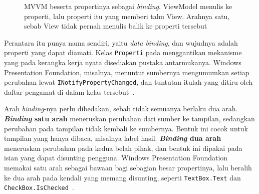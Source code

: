 \begin{figure}[htbp]
  \centering
  \caption{MVVM beserta propertinya sebagai \textit{binding}. ViewModel menulis ke
    properti, lalu properti itu yang memberi tahu View. Arahnya satu, sebab
    View tidak pernah menulis balik ke properti tersebut}
  \label{fig:mvvm}
\end{figure}

Perantara itu punya nama sendiri, yaitu \textit{data
binding}, dan wujudnya
adalah properti yang dapat diamati. Kelas \texttt{Properti} pada
 menggantikan mekanisme yang pada kerangka
kerja nyata disediakan pustaka antarmukanya. Windows Presentation Foundation,
misalnya, menuntut sumbernya mengumumkan setiap perubahan lewat
\texttt{INotifyPropertyChanged}, dan tuntutan itulah yang ditiru oleh daftar
pengamat di dalam kelas tersebut~\cite{microsoft2024binding}.

Arah \textit{binding}-nya perlu dibedakan, sebab tidak semuanya berlaku dua
arah. \textbf{\textit{Binding} satu arah} meneruskan perubahan dari sumber ke
tampilan, sedangkan perubahan pada tampilan tidak kembali ke sumbernya. Bentuk
ini cocok untuk tampilan yang hanya dibaca, misalnya label hasil.
\textbf{\textit{Binding} dua arah} meneruskan perubahan pada kedua belah pihak, dan
bentuk ini dipakai pada isian yang dapat disunting pengguna. Windows
Presentation Foundation memakai satu arah sebagai bawaan bagi sebagian besar
propertinya, lalu beralih ke dua arah pada kendali yang memang disunting,
seperti \texttt{TextBox.Text} dan
\texttt{CheckBox.IsChecked}~\cite{microsoft2024binding}.

